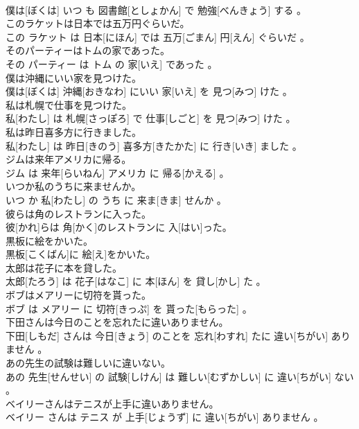 \documentclass[8pt]{extreport}
\begin{document}
\begin{CJK}{UTF8}{min}
\\	僕は[ぼくは] いつ も 図書館[としょかん] で 勉強[べんきょう] する 。
\\	このラケットは日本では五万円ぐらいだ。	
\\	この ラケット は 日本[にほん] では 五万[ごまん] 円[えん] ぐらいだ 。
\\	そのパーティーはトムの家であった。	
\\	その パーティー は トム の 家[いえ] であった 。
\\	僕は沖縄にいい家を見つけた。	
\\	僕は[ぼくは] 沖縄[おきなわ] にいい 家[いえ] を 見つ[みつ] けた 。
\\	私は札幌で仕事を見つけた。	
\\	私[わたし] は 札幌[さっぽろ] で 仕事[しごと] を 見つ[みつ] けた 。
\\	私は昨日喜多方に行きました。	
\\	私[わたし] は 昨日[きのう] 喜多方[きたかた] に 行き[いき] ました 。
\\	ジムは来年アメリカに帰る。	
\\	ジム は 来年[らいねん] アメリカ に 帰る[かえる] 。
\\	いつか私のうちに来ませんか。	
\\	いつ か 私[わたし] の うち に 来ま[きま] せんか 。
\\	彼らは角のレストランに入った。	
\\	彼[かれ]らは 角[かく]のレストランに 入[はい]った。
\\	黒板に絵をかいた。	
\\	黒板[こくばん]に 絵[え]をかいた。
\\	太郎は花子に本を貸した。	
\\	太郎[たろう] は 花子[はなこ] に 本[ほん] を 貸し[かし] た 。
\\	ボブはメアリーに切符を貰った。	
\\	ボブ は メアリー に 切符[きっぷ] を 貰った[もらった] 。
\\	下田さんは今日のことを忘れたに違いありません。	
\\	下田[しもだ] さんは 今日[きょう] のことを 忘れ[わすれ] たに 違い[ちがい] ありません 。
\\	あの先生の試験は難しいに違いない。	
\\	あの 先生[せんせい] の 試験[しけん] は 難しい[むずかしい] に 違い[ちがい] ない 。
\\	ベイリーさんはテニスが上手に違いありません。	
\\	ベイリー さんは テニス が 上手[じょうず] に 違い[ちがい] ありません 。

\end{CJK}
\end{document}
